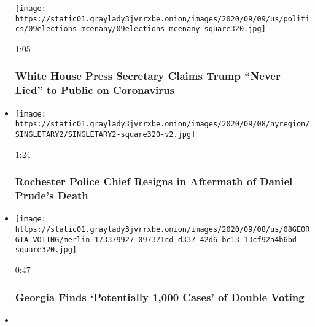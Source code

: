 \begin{itemize}
  \texttt{[image: https://static01.graylady3jvrrxbe.onion/images/2020/09/09/us/politics/09elections-mcenany/09elections-mcenany-square320.jpg]}

  1:05

  \hypertarget{white-house-press-secretary-claims-trump-never-lied-to-public-on-coronavirus}{%
  \subsubsection{White House Press Secretary Claims Trump ``Never Lied''
  to Public on
  Coronavirus}\label{white-house-press-secretary-claims-trump-never-lied-to-public-on-coronavirus}}
\item
  \href{https://www.nytimes3xbfgragh.onion/video/us/politics/100000007330362/rochester-police-chief-resigns-video.html?action=click\&module=video-series-bar\&region=header\&pgtype=Article\&playlistId=video/us-politics}{}

  \texttt{[image: https://static01.graylady3jvrrxbe.onion/images/2020/09/08/nyregion/SINGLETARY2/SINGLETARY2-square320-v2.jpg]}

  1:24

  \hypertarget{rochester-police-chief-resigns-in-aftermath-of-daniel-prudes-death}{%
  \subsubsection{Rochester Police Chief Resigns in Aftermath of Daniel
  Prude's
  Death}\label{rochester-police-chief-resigns-in-aftermath-of-daniel-prudes-death}}
\item
  \href{https://www.nytimes3xbfgragh.onion/video/us/elections/100000007330247/georgia-double-voting-investigation.html?action=click\&module=video-series-bar\&region=header\&pgtype=Article\&playlistId=video/us-politics}{}

  \texttt{[image: https://static01.graylady3jvrrxbe.onion/images/2020/09/08/us/08GEORGIA-VOTING/merlin\_173379927\_097371cd-d337-42d6-bc13-13cf92a4b6bd-square320.jpg]}

  0:47

  \hypertarget{georgia-finds-potentially-1000-cases-of-double-voting}{%
  \subsubsection{Georgia Finds `Potentially 1,000 Cases' of Double
  Voting}\label{georgia-finds-potentially-1000-cases-of-double-voting}}
\item
  \href{https://www.nytimes3xbfgragh.onion/video/us/elections/100000007329950/trump-presidential-campaign-funding.html?action=click\&module=video-series-bar\&region=header\&pgtype=Article\&playlistId=video/us-politics}{}


\end{itemize}

